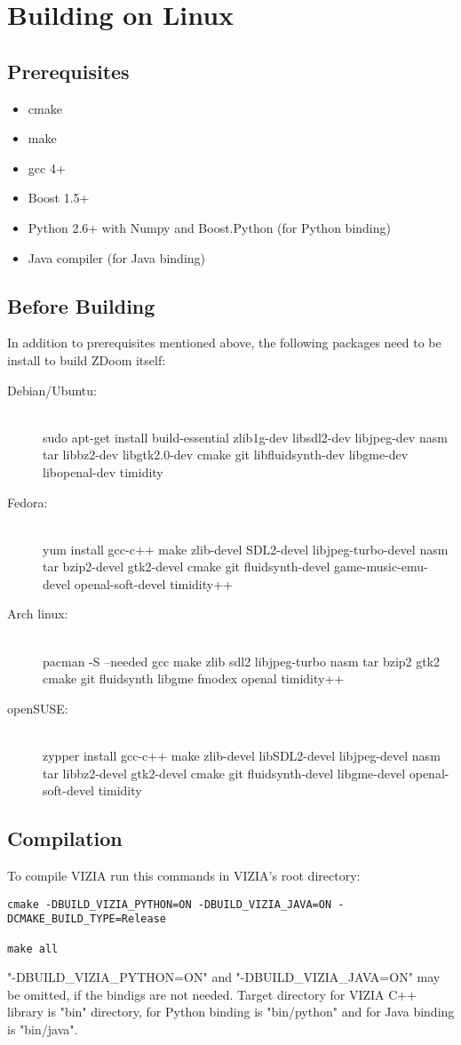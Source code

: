 \chapter{Building on Linux}
\section{Prerequisites}
\begin{itemize}
\item cmake
\item make
\item gcc 4+
\item Boost 1.5+
\item Python 2.6+ with Numpy and Boost.Python (for Python binding)
\item Java compiler (for Java binding)
\end{itemize}
\section{Before Building}
	In addition to prerequisites mentioned above, the following packages need to be install to build ZDoom itself:
	\begin{description}
		\item[Debian/Ubuntu:] \hfill \\
		sudo apt-get install build-essential zlib1g-dev libsdl2-dev libjpeg-dev nasm tar libbz2-dev libgtk2.0-dev cmake git libfluidsynth-dev libgme-dev libopenal-dev timidity
		\item[Fedora:] \hfill \\
		yum install gcc-c++ make zlib-devel SDL2-devel libjpeg-turbo-devel nasm tar bzip2-devel gtk2-devel cmake git fluidsynth-devel game-music-emu-devel	openal-soft-devel timidity++
		\item[Arch linux:] \hfill \\
		pacman -S --needed gcc make zlib sdl2 libjpeg-turbo nasm tar bzip2 gtk2 cmake git fluidsynth libgme fmodex openal timidity++
		\item[openSUSE:] \hfill \\
		zypper install gcc-c++ make zlib-devel libSDL2-devel libjpeg-devel nasm tar libbz2-devel gtk2-devel cmake git fluidsynth-devel libgme-devel openal-soft-devel timidity
	\end{description}
\section{Compilation}
To compile VIZIA run this commands in VIZIA's root directory:
	\begin{lstlisting}
cmake -DBUILD_VIZIA_PYTHON=ON -DBUILD_VIZIA_JAVA=ON -DCMAKE_BUILD_TYPE=Release

make all
    \end{lstlisting}

"-DBUILD_VIZIA_PYTHON=ON" and "-DBUILD_VIZIA_JAVA=ON" may be omitted, if the bindigs are not needed.
Target directory for VIZIA C++ library is "bin" directory, for Python binding is "bin/python" and for Java binding is "bin/java".

